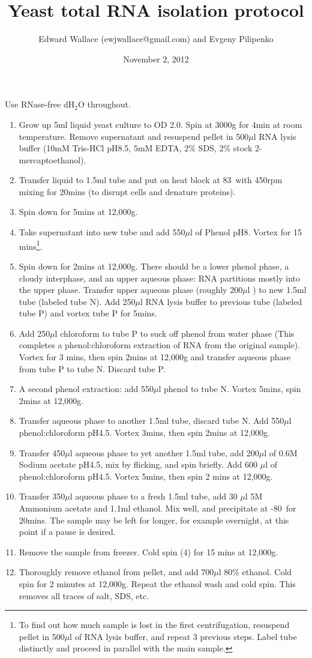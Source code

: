 \documentclass{article}
\newcommand{\mul}{\ensuremath{\mu}l }
\begin{document}
\title{Yeast total RNA isolation protocol}
\author{Edward Wallace (ewjwallace@gmail.com) and Evgeny Pilipenko}
\date{November 2, 2012}
\maketitle

Use RNase-free dH$_2$O throughout.

\begin{enumerate}
  \item Grow up 5ml liquid yeast culture to OD 2.0. Spin at 3000g for 4min at room temperature. Remove supernatant and resuspend pellet in 500\mul RNA lysis buffer (10mM Tris-HCl pH8.5, 5mM EDTA, 2\% SDS, 2\% stock 2-mercaptoethanol).
  \item Transfer liquid to 1.5ml tube and put on heat block at 83\celsius\ with 450rpm mixing for 20mins (to disrupt cells and denature proteins).
  \item Spin down for 5mins at 12,000g.
  \item Take supernatant into new tube and add 550\mul of Phenol pH8. Vortex for 15 mins\footnote{To find out how much sample is lost in the first centrifugation, resuspend pellet in 500\mul of RNA lysis buffer, and repeat 3 previous steps. Label tube distinctly  and proceed in parallel with the main sample.}.
\item Spin down for 2mins at 12,000g. There should be a lower phenol phase, a cloudy interphase, and an upper aqueous phase: RNA partitions mostly into the upper phase. Transfer upper aqueous phase (roughly 200\mul) to new 1.5ml tube (labeled tube N). Add 250\mul RNA lysis buffer to previous tube (labeled tube P) and vortex tube P for 5mins.
\item Add 250\mul chloroform to tube P to suck off phenol from water phase (This completes a phenol:chloroform extraction of RNA from the original sample). Vortex for 3 mins, then spin 2mins at 12,000g and transfer aqueous phase from tube P to tube N. Discard tube P.
\item A second phenol extraction: add 550\mul phenol to tube N. Vortex 5mins, spin 2mins at 12,000g.
\item Transfer aqueous phase to another 1.5ml tube, discard tube N. Add 550\mul phenol:chloroform pH4.5. Vortex 3mins, then spin 2mins at 12,000g.
\item Transfer 450\mul aqueous phase to yet another 1.5ml tube, add 200\mul of 0.6M Sodium acetate pH4.5, mix by flicking, and spin briefly. Add 600 \mul of phenol:chloroform pH4.5. Vortex 5mins, then spin 2 mins at 12,000g.
\item Transfer 350\mul aqueous phase to a fresh 1.5ml tube, add 30 \mul 5M Ammonium acetate and 1.1ml ethanol. Mix well, and precipitate at -80\celsius\ for 20mins. The sample may be left for longer, for example overnight, at this point if a pause is desired.
\item Remove the sample from freezer. Cold spin (4\celsius) for 15 mins at 12,000g. 
\item Thoroughly remove ethanol from pellet, and add 700\mul 80\% ethanol. Cold spin for 2 minutes at 12,000g. Repeat the ethanol wash and cold spin. This removes all traces of salt, SDS, etc.


\end{enumerate}
\end{document}
